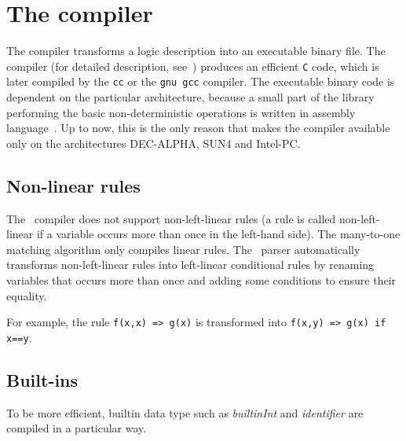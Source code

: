 \section{The compiler}
\label{compilo}

The \elan{} compiler transforms a logic description into an executable
binary file.  The compiler (for detailed description,
see~\cite{Vittek-RTA96,MoreauK-PLILP+ALP98}) produces an efficient
\verb|C| code, which is later compiled by the \verb|cc| or the
\verb|gnu gcc| compiler. 
The executable binary code is dependent on the particular
architecture, because a small part of the \elan{} library performing
the basic non-deterministic operations is written in assembly
language~\cite{Moreau-JICSLPW98}.
Up to now, this is the only reason that makes
the compiler available only on the architectures DEC-ALPHA, SUN4 and
Intel-PC.  

\subsection{Non-linear rules}
The \elan\ compiler does not support non-left-linear rules (a rule is
called non-left-linear if a variable occurs more than once in the
left-hand side).
The many-to-one matching algorithm only compiles linear rules. 
The \elan\ parser automatically transforms non-left-linear rules into
left-linear conditional rules by renaming variables that occurs more
than once and adding some conditions to ensure their equality.

For example, the rule \texttt{f(x,x) => g(x)} is transformed into
\texttt{f(x,y) => g(x) if x==y}.


\subsection{Built-ins}
To be more efficient, builtin data type such as
\textit{builtinInt} and \textit{identifier} are compiled in a
particular way. 

